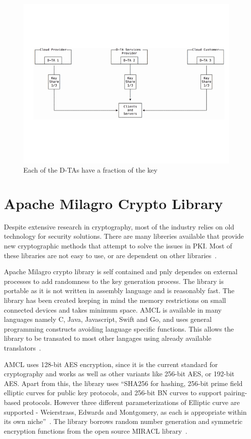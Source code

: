 \begin{figure}[!ht]
  \centering\includegraphics[width=\columnwidth]{../images/dta.pdf}
  \caption{Each of the D-TAs have a fraction of the key~\cite{dta-image}
  }\label{f:fig1}
\end{figure}

\section{Apache Milagro Crypto Library}
Despite extensive research in cryptography, most of the industry
relies on old technology for security solutions. There are many
libreries available that provide new cryptographic methods that
attempt to solve the issues in PKI\@. Most of these libraries are not
easy to use, or are dependent on other
libraries~\cite{mcl-white-paper}.

Apache Milagro crypto library is self contained and pnly dependes on
external processes to add randomness to the key generation
process. The library is portable as it is not written in assembly
language and is reasonably fast. The library has been created keeping
in mind the memory restrictions on small connected devices and takes
minimum space. AMCL is available in many languages namely C, Java,
Javascript, Swift and Go, and uses general programming constructs
avoiding language specific functions. This allows the library to be
transated to most other langages using already available
translators~\cite{mcl-white-paper}.

AMCL uses 128-bit AES encryption, since it is the current standard for
cryptography and works as well as other variants like 256-bit AES, or
192-bit AES\@. Apart from this, the library uses ``SHA256 for hashing,
256-bit prime field elliptic curves for public key protocols, and
256-bit BN curves to support pairing-based protocols. However three
different parameterizations of Elliptic curve are supported -
Weierstrass, Edwards and Montgomery, as each is appropriate within its
own niche''~\cite{mcl-white-paper}. The library borrows random number
generation and symmetric encryption functions from the open source
MIRACL library~\cite{mcl-white-paper}.


